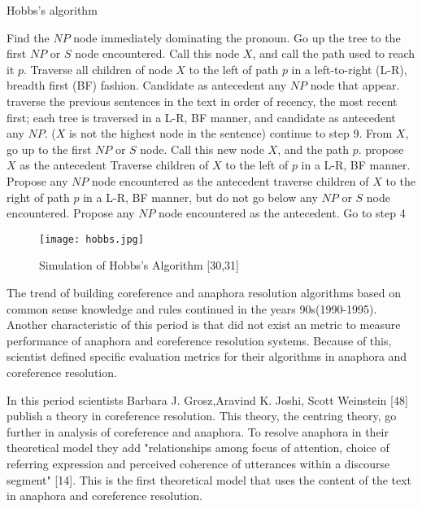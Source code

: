 \newpage
\begin{algorithm}[H]
\caption{Hobbs's algorithm}\label{alg:Hobbs}
\begin{algorithmic}[1]
\State Find the $NP$ node immediately dominating the pronoun.
\State Go up the tree to the first $NP$ or $S$ node encountered. Call this node $X$, and call the path used to reach it $p$.
\State Traverse all children of node $X$ to the left of path $p$ in a left-to-right (L-R), breadth first (BF) fashion. Candidate as antecedent any $NP$ node that appear.
	\State traverse the previous sentences in the text in order of recency, the most recent first; each tree is traversed in a L-R, BF manner, and candidate as antecedent any $NP$.
\Else
	\State ($X$ is not the highest node in the sentence) continue to step 9.
\EndIf
\State From $X$, go up to the first $NP$ or $S$ node. Call this new node $X$, and the path $p$.
     \State propose $X$ as the antecedent
\EndIf
\State Traverse children of $X$ to the left of $p$ in a L-R, BF manner. Propose any $NP$ node encountered as the antecedent
    \State traverse children of $X$ to the right of path $p$ in a L-R, BF manner, but do not go below any $NP$ or $S$ node encountered.
    \State Propose any $NP$ node encountered as the antecedent.
\EndIf
\State Go to step 4
\end{algorithmic}
\end{algorithm}

\begin{figure}[h]
	\texttt{[image: hobbs.jpg]} 
 	\caption{Simulation of Hobbs's Algorithm [30,31] }
	\label{Figure 5}
\end{figure}

The trend of building coreference and anaphora resolution algorithms based on common sense knowledge and rules continued in the years 90s(1990-1995). Another characteristic of this period is that did not exist an metric to measure performance of anaphora and coreference resolution systems. Because of this, scientist defined specific evaluation metrics for their algorithms in anaphora and coreference resolution.

In this period scientists Barbara J. Grosz,Aravind K. Joshi, Scott Weinstein [48] publish a theory in coreference resolution. This theory, the centring theory, go further in analysis of coreference and anaphora. To resolve anaphora in their theoretical model they add "relationships among focus of attention, choice of referring expression and perceived coherence of utterances within a discourse segment" [14]. This is the first theoretical model that uses the content of the text in anaphora and coreference resolution.

